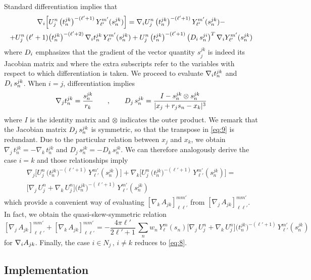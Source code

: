 Standard differentiation implies that
\begin{multline}\label{eq:9}
\nabla_i \Big[ U_j^n  \,  \big( t_n^{jk}\big)^{-(\ell'+1)} \, Y_{\ell'}^{m'} (s_n^{jk}) \Big] = \nabla_i U_j^n  \,  \big( t_n^{jk}\big)^{-(\ell'+1)} \, Y_{\ell'}^{m'} (s_n^{jk}) - \\
+ U_j^n  \, (\ell' + 1)  \big( t_n^{jk}\big)^{-(\ell'+2)} \, \nabla_i t_n^{jk} \, Y_{\ell'}^{m'} (s_n^{jk}) + U_j^n  \,  \big( t_n^{jk}\big)^{-(\ell'+1)} \, \big( D_i\, s_n^{ji} \big)^T\, \nabla_i Y_{\ell'}^{m'} (s_n^{jk})
\end{multline}
where $D_i$ emphasizes that the gradient of the vector quantity $s_j^{jk}$ is indeed its Jacobian matrix and where the extra subscripts refer to the variables with respect to which differentiation is taken. We proceed to evaluate $\nabla_i t_n^{jk}$ and $ D_i \, s_n^{jk}$. When $i = j$, differentiation implies
\[
\nabla_j t_n^{jk} = \frac{s_n^{jk}}{r_k} \qquad , \qquad D_j \, s_n^{jk} = \frac{I - s_n^{jk} \otimes s_n^{jk} }{|x_j + r_j s_n - x_k|^3}
\]
where $I$ is the identity matrix and $\otimes$ indicates the outer product. We remark that the Jacobian matrix $D_j \, s_n^{jk}$ is symmetric, so that the transpose in \eqref{eq:9} is redundant. 
Due to the particular relation between $x_j$ and $x_k$, we obtain $\nabla_{\! j} \, t_n^{jk} = - \nabla_{\! k} \, t_n^{jk}$ and $D_j \, s_n^{jk} = - D_k \, s_n^{jk}$.
We can therefore analogously derive the case $i = k$ and those relationships imply
\begin{multline*}
\nabla_{\! j} \Big[ U_j^n  \,  \big( t_n^{jk}\big)^{-(\ell'+1)} \, Y_{\ell'}^{m'} (s_n^{jk}) \Big] + \nabla_{\! k} \Big[ U_j^n  \,  \big( t_n^{jk}\big)^{-(\ell'+1)} \, Y_{\ell'}^{m'} (s_n^{jk}) \Big] = \\
  \Big[ \nabla_{\! j} \, U_j^n + \nabla_{\! k} \, U_j^n  \Big]  \big( t_n^{jk}\big)^{-(\ell'+1)} \, Y_{\ell'}^{m'} (s_n^{jk})
\end{multline*}
which provide a convenient way of evaluating $[\nabla_{\! k} \, A_{jk}]_{\ell \ell'}^{m m'}$ from $[\nabla_{\! j} \, A_{jk}]_{\ell \ell'}^{m m'}$. In fact, we obtain the quasi-skew-symmetric relation
\[
[ \nabla_{\! j} \, A_{jk}]_{\ell \ell'}^{m m'} + [\nabla_{\! k} \, A_{jk}]_{\ell \ell'}^{m m'} = -  \frac{4 \pi \ell'}{2 \ell'+1} \, \sum_{n} w_n\, Y_\ell^m(s_n) \Big[ \nabla_{\! j} \, U_j^n + \nabla_{\! k} \, U_j^n  \Big]  \big( t_n^{jk}\big)^{-(\ell'+1)} \, Y_{\ell'}^{m'} (s_n^{jk})
\]
for $\nabla_i A_{jk}$. Finally, the case $i \in N_j \, , \, i \not= k$ reduces to \eqref{eq:8}.

\subsection{Implementation}